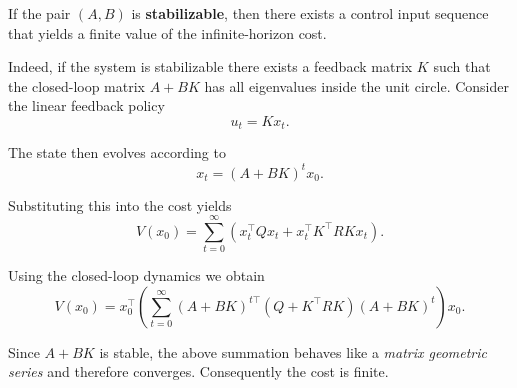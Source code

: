 \begin{theorembox}[Feasibility]
If the pair $(A,B)$ is \textbf{stabilizable}, then there exists a control input
sequence that yields a finite value of the infinite-horizon cost.
\end{theorembox}

Indeed, if the system is stabilizable there exists a feedback matrix
$K$ such that the closed-loop matrix $A + BK$ has all eigenvalues
inside the unit circle.  
Consider the linear feedback policy
\[
u_t = K x_t .
\]

The state then evolves according to
\[
x_t = (A + BK)^t x_0 .
\]

Substituting this into the cost yields
\[
V(x_0)
=
\sum_{t=0}^{\infty}
\left(
x_t^\top Q x_t
+
x_t^\top K^\top R K x_t
\right).
\]

Using the closed-loop dynamics we obtain
\[
V(x_0)
=
x_0^\top
\left(
\sum_{t=0}^{\infty}
(A+BK)^{t\top}
(Q + K^\top R K)
(A+BK)^t
\right)
x_0 .
\]

Since $A+BK$ is stable, the above summation behaves like a
\emph{matrix geometric series} and therefore converges.
Consequently the cost is finite.\\

